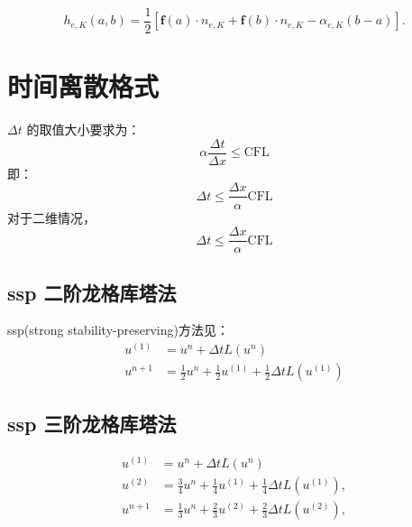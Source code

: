 \documentclass{article}
\numberwithin{equation}{subsection}    %
\begin{document}
\begin{equation}
    h_{e, K}(a, b)=\frac{1}{2}\left[\mathbf{f}(a) \cdot n_{e, K}+\mathbf{f}(b) \cdot n_{e, K}-\alpha_{e, K}(b-a)\right] .
\end{equation}

\section{时间离散格式}
$\Delta t$ 的取值大小要求为：\cite{RN109}
\begin{equation}
    \alpha \frac{\Delta t}{\Delta x} \leq \text{CFL}
\end{equation}
即：
\begin{equation}
    \Delta t \leqslant \frac{\Delta x}{\alpha}\text{CFL}
\end{equation}
对于二维情况，
\begin{equation}
    \Delta t \leqslant \frac{\Delta x}{\alpha}\text{CFL}
\end{equation}

\subsection{ssp 二阶龙格库塔法}
ssp(strong stability-preserving)方法见：\cite{RN96}
\begin{equation}
    \begin{aligned}
        u^{(1)} & =u^{n}+\Delta t L\left(u^{n}\right)                                               \\
        u^{n+1} & =\frac{1}{2} u^{n}+\frac{1}{2} u^{(1)}+\frac{1}{2} \Delta t L\left(u^{(1)}\right)
    \end{aligned}
\end{equation}
\subsection{ssp 三阶龙格库塔法}
\begin{equation}
    \begin{aligned}
        u^{(1)} & =u^{n}+\Delta t L\left(u^{n}\right)                                                \\
        u^{(2)} & =\frac{3}{4} u^{n}+\frac{1}{4} u^{(1)}+\frac{1}{4} \Delta t L\left(u^{(1)}\right), \\
        u^{n+1} & =\frac{1}{3} u^{n}+\frac{2}{3} u^{(2)}+\frac{2}{3} \Delta t L\left(u^{(2)}\right),
    \end{aligned}
\end{equation}
\end{document}
